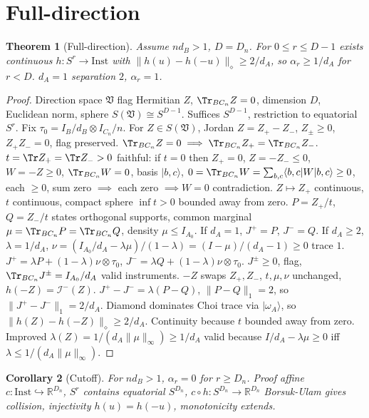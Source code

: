 \documentclass[11pt,a4paper]{article}
\newtheorem{theorem}{Theorem}[section]
\newtheorem{corollary}[theorem]{Corollary}
\newcommand{\Inst}{\mathrm{Inst}}
\begin{document}
\section{Full-direction}
\begin{theorem}[Full-direction]
Assume $nd_B>1$, $D=D_n$. For $0\le r\le D-1$ exists continuous $h:S^r\to\Inst$ with $\|h(u)-h(-u)\|_{\diamond}\ge2/d_A$, so $\alpha_r\ge1/d_A$ for $r<D$. $d_A=1$ separation $2$, $\alpha_r=1$.
\end{theorem}
\begin{proof}
Direction space $\mathfrak V$ flag Hermitian $Z$, $\Tr_{BC_n}Z=0$, dimension $D$, Euclidean norm, sphere $S(\mathfrak V)\cong S^{D-1}$. Suffices $S^{D-1}$, restriction to equatorial $S^r$.
Fix $\tau_0=I_B/d_B\otimes I_{C_n}/n$.
For $Z\in S(\mathfrak V)$, Jordan $Z=Z_+-Z_-$, $Z_\pm\ge0$, $Z_+Z_-=0$, flag preserved.
$\Tr_{BC_n}Z=0\implies\Tr_{BC_n}Z_+=\Tr_{BC_n}Z_-$.
$t=\Tr Z_+=\Tr Z_->0$ faithful: if $t=0$ then $Z_+=0$, $Z=-Z_-\le0$, $W=-Z\ge0$, $\Tr_{BC_n}W=0$, basis $|b,c\rangle$, $0=\Tr_{BC_n}W=\sum_{b,c}\langle b,c|W|b,c\rangle\ge0$, each $\ge0$, sum zero $\implies$ each zero $\implies W=0$ contradiction.
$Z\mapsto Z_+$ continuous, $t$ continuous, compact sphere $\inf t>0$ bounded away from zero.
$P=Z_+/t$, $Q=Z_-/t$ states orthogonal supports, common marginal $\mu=\Tr_{BC_n}P=\Tr_{BC_n}Q$, density $\mu\le I_{A_0}$.
If $d_A=1$, $J^+=P$, $J^-=Q$.
If $d_A\ge2$, $\lambda=1/d_A$, $\nu=(I_{A_0}/d_A-\lambda\mu)/(1-\lambda)=(I-\mu)/(d_A-1)\ge0$ trace $1$.
$J^+=\lambda P+(1-\lambda)\nu\otimes\tau_0$, $J^-=\lambda Q+(1-\lambda)\nu\otimes\tau_0$.
$J^\pm\ge0$, flag, $\Tr_{BC_n}J^\pm=I_{A_0}/d_A$ valid instruments.
$-Z$ swaps $Z_+,Z_-$, $t,\mu,\nu$ unchanged, $h(-Z)=\mathcal I^-(Z)$.
$J^+-J^-=\lambda(P-Q)$, $\|P-Q\|_1=2$, so $\|J^+-J^-\|_1=2/d_A$.
Diamond dominates Choi trace via $|\omega_A\rangle$, so $\|h(Z)-h(-Z)\|_{\diamond}\ge2/d_A$.
Continuity because $t$ bounded away from zero.
Improved $\lambda(Z)=1/(d_A\|\mu\|_\infty)\ge1/d_A$ valid because $I/d_A-\lambda\mu\ge0$ iff $\lambda\le1/(d_A\|\mu\|_\infty)$.
\end{proof}
\begin{corollary}[Cutoff]
For $nd_B>1$, $\alpha_r=0$ for $r\ge D_n$. Proof affine $c:\Inst\hookrightarrow\mathbb R^{D_n}$, $S^r$ contains equatorial $S^{D_n}$, $c\circ h:S^{D_n}\to\mathbb R^{D_n}$ Borsuk-Ulam gives collision, injectivity $h(u)=h(-u)$, monotonicity extends.
\end{corollary}
\end{document}
